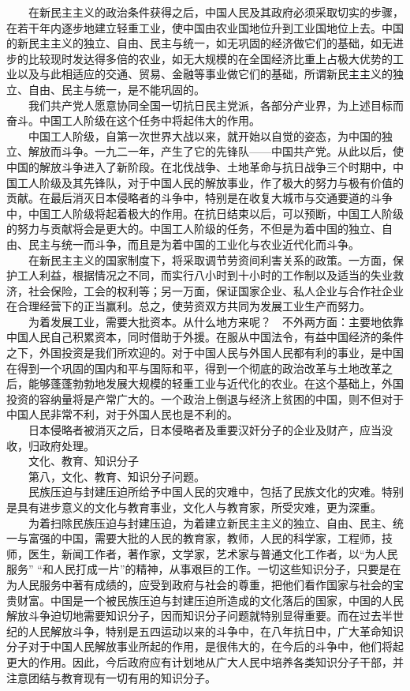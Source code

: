 \documentclass[cn,11pt,chinese]{elegantbook}
\begin{document}
　　在新民主主义的政治条件获得之后，中国人民及其政府必须采取切实的步骤，在若干年内逐步地建立轻重工业，使中国由农业国地位升到工业国地位上去。中国的新民主主义的独立、自由、民主与统一，如无巩固的经济做它们的基础，如无进步的比较现时发达得多倍的农业，如无大规模的在全国经济比重上占极大优势的工业以及与此相适应的交通、贸易、金融等事业做它们的基础，所谓新民主主义的独立、自由、民主与统一，是不能巩固的。\\
　　我们共产党人愿意协同全国一切抗日民主党派，各部分产业界，为上述目标而奋斗。中国工人阶级在这个任务中将起伟大的作用。\\
　　中国工人阶级，自第一次世界大战以来，就开始以自觉的姿态，为中国的独立、解放而斗争。一九二一年，产生了它的先锋队——中国共产党。从此以后，使中国的解放斗争进入了新阶段。在北伐战争、土地革命与抗日战争三个时期中，中国工人阶级及其先锋队，对于中国人民的解放事业，作了极大的努力与极有价值的贡献。在最后消灭日本侵略者的斗争中，特别是在收复大城市与交通要道的斗争中，中国工人阶级将起着极大的作用。在抗日结束以后，可以预断，中国工人阶级的努力与贡献将会是更大的。中国工人阶级的任务，不但是为着中国的独立、自由、民主与统一而斗争，而且是为着中国的工业化与农业近代化而斗争。\\
　　在新民主主义的国家制度下，将采取调节劳资间利害关系的政策。一方面，保护工人利益，根据情况之不同，而实行八小时到十小时的工作制以及适当的失业救济，社会保险，工会的权利等；另一万面，保证国家企业、私人企业与合作社企业在合理经营下的正当赢利。总之，使劳资双方共同为发展工业生产而努力。\\
　　为着发展工业，需要大批资本。从什么地方来呢？　不外两方面：主要地依靠中国人民自己积累资本，同时借助于外援。在服从中国法令，有益中国经济的条件之下，外国投资是我们所欢迎的。对于中国人民与外国人民都有利的事业，是中国在得到一个巩固的国内和平与国际和平，得到一个彻底的政治改革与土地改革之后，能够蓬蓬勃勃地发展大规模的轻重工业与近代化的农业。在这个基础上，外国投资的容纳量将是产常广大的。一个政治上倒退与经济上贫困的中国，则不但对于中国人民非常不利，对于外国人民也是不利的。\\
　　日本侵略者被消灭之后，日本侵略者及重要汉奸分子的企业及财产，应当没收，归政府处理。\\
　　文化、教育、知识分子\\
　　第八，文化、教育、知识分子问题。\\
　　民族压迫与封建压迫所给予中国人民的灾难中，包括了民族文化的灾难。特别是具有进步意义的文化与教育事业，文化人与教育家，所受灾难，更为深重。\\
　　为着扫除民族压迫与封建压迫，为着建立新民主主义的独立、自由、民主、统一与富强的中国，需要大批的人民的教育家，教师，人民的科学家，工程师，技师，医生，新闻工作者，著作家，文学家，艺术家与普通文化工作者，以“为人民服务” “和人民打成一片”的精神，从事艰巨的工作。一切这些知识分子，只要是在为人民服务中著有成绩的，应受到政府与社会的尊重，把他们看作国家与社会的宝贵财富。中国是一个被民族压迫与封建压迫所造成的文化落后的国家，中国的人民解放斗争迫切地需要知识分子，因而知识分子问题就特别显得重要。而在过去半世纪的人民解放斗争，特别是五四运动以来的斗争中，在八年抗日中，广大革命知识分子对于中国人民解放事业所起的作用，是很伟大的，在今后的斗争中，他们将起更大的作用。因此，今后政府应有计划地从广大人民中培养各类知识分子干部，并注意团结与教育现有一切有用的知识分子。\\
\end{document}
